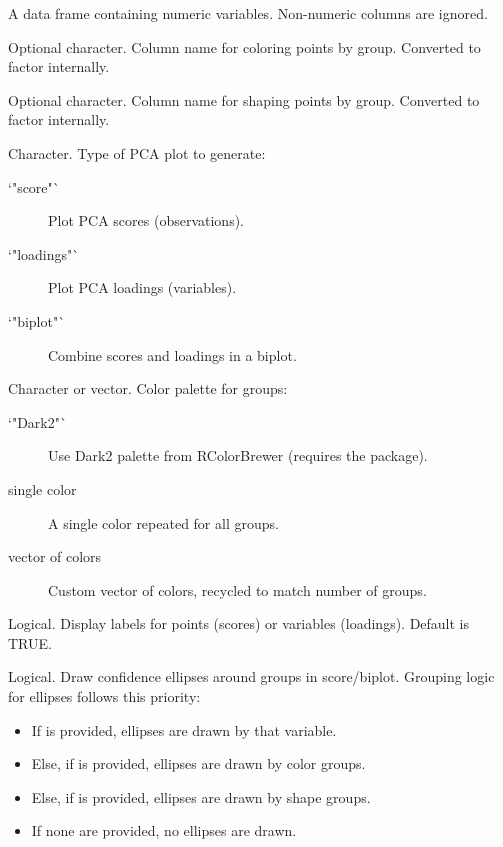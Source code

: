 \documentclass[a4paper]{book}
\begin{document}
\begin{Arguments}
\begin{ldescription}
\item[\code{data}] A data frame containing numeric variables. Non-numeric columns are ignored.

\item[\code{color\_var}] Optional character. Column name for coloring points by group. Converted to factor internally.

\item[\code{shape\_var}] Optional character. Column name for shaping points by group. Converted to factor internally.

\item[\code{plot\_type}] Character. Type of PCA plot to generate:
\begin{description}

\item[`"score"`] Plot PCA scores (observations).
\item[`"loadings"`] Plot PCA loadings (variables).
\item[`"biplot"`] Combine scores and loadings in a biplot.

\end{description}


\item[\code{palette}] Character or vector. Color palette for groups:
\begin{description}

\item[`"Dark2"`] Use Dark2 palette from RColorBrewer (requires the package).
\item[single color] A single color repeated for all groups.
\item[vector of colors] Custom vector of colors, recycled to match number of groups.

\end{description}


\item[\code{show\_labels}] Logical. Display labels for points (scores) or variables (loadings). Default is TRUE.

\item[\code{ellipses}] Logical. Draw confidence ellipses around groups in score/biplot. Grouping logic for ellipses follows this priority:
\begin{itemize}

\item{} If  is provided, ellipses are drawn by that variable.
\item{} Else, if  is provided, ellipses are drawn by color groups.
\item{} Else, if  is provided, ellipses are drawn by shape groups.
\item{} If none are provided, no ellipses are drawn.


\end{itemize}
\end{ldescription}
\end{Arguments}
\end{document}
